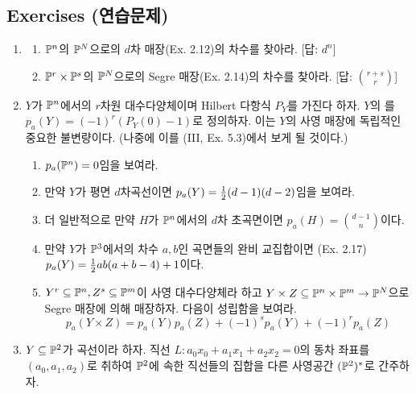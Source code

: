 	
	\begin{remark}
	\end{remark}
	
	
	
	\subsection*{Exercises (연습문제)}
	
	\begin{enumerate}[label=\tb{7.\arabic*.},itemindent=0mm,itemsep=2mm]
	\item \begin{enumerate}[label=(\alph*)]
	\item $\mathbb{P}^n$의 $\mathbb{P}^N$으로의 $d$차 매장(Ex. 2.12)의 차수를 찾아라. [답: $d^n$]
	\item $\mathbb{P}^r\times\mathbb{P}^s$의 $\mathbb{P}^N$으로의 Segre 매장(Ex. 2.14)의 차수를 찾아라. [답: $\binom{r+s}r$]
	\end{enumerate}
	\item $Y$가 $\mathbb{P}^n$에서의 $r$차원 대수다양체이며 Hilbert 다항식 $P_Y$를 가진다 하자.
	$Y$의 를 $p_a(Y)=(-1)^r(P_Y(0)-1)$로 정의하자.
	이는 $Y$의 사영 매장에 독립적인 중요한 불변량이다. (나중에 이를 (III, Ex. 5.3)에서 보게 될 것이다.)
	\begin{enumerate}[label=(\alph*)]
	\item $p_a(\mathbb{P}^n)=0$임을 보여라.
	\item 만약 $Y$가 평면 $d$차곡선이면 $p_a(Y)=\frac{1}{2}(d-1)(d-2)$임을 보여라.
	\item 더 일반적으로 만약 $H$가 $\mathbb{P}^n$에서의 $d$차 초곡면이면 $p_a(H)=\binom{d-1}n$이다.
	\item 만약 $Y$가 $\mathbb{P}^3$에서의 차수 $a,b$인 곡면들의 완비 교집합이면 (Ex. 2.17)
	$p_a(Y)=\frac{1}{2}ab(a+b-4)+1$이다.
	\item $Y^r\subseteq\mathbb{P}^n,Z^s\subseteq\mathbb{P}^m$이 사영 대수다양체라 하고
	$Y\times Z\subseteq\mathbb{P}^n\times\mathbb{P}^m\rightarrow\mathbb{P}^N$으로 Segre 매장에 의해 매장하자. 다음이 성립함을 보여라.
	$$p_a(Y\times Z)=p_a(Y)p_a(Z)+(-1)^sp_a(Y)+(-1)^rp_a(Z)$$
	\end{enumerate}
	\item {} $Y\subseteq\mathbb{P}^2$가 곡선이라 하자.
	직선 $L:a_0x_0+a_1x_1+a_2x_2=0$의 동차 좌표를 $(a_0,a_1,a_2)$로 취하여
	$\mathbb{P}^2$에 속한 직선들의 집합을 다른 사영공간 $(\mathbb{P}^2)^*$로 간주하자.

\end{enumerate}
